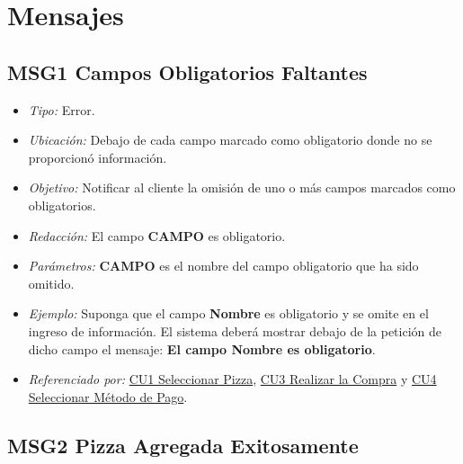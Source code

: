 
\pagebreak
\section{Mensajes}

	\hypertarget{MSG1:CamposObligatorios}{}
	\subsection{MSG1 Campos Obligatorios Faltantes}

		\begin{itemize}

			\item \textit{Tipo:} Error.

			\item\textit{Ubicación:}  Debajo de cada campo marcado como obligatorio donde no se proporcionó información.

			\item \textit{Objetivo:} Notificar al cliente la omisión de uno o más campos marcados como obligatorios.

			\item \textit{Redacción:} El campo \textbf{CAMPO} es obligatorio.

			\item \textit{Parámetros:} \textbf{CAMPO} es el nombre del campo obligatorio que ha sido omitido.

			\item \textit{Ejemplo:} Suponga que el campo \textbf{Nombre} es obligatorio y se omite en el ingreso de información. El sistema deberá mostrar debajo de la petición de dicho campo el mensaje: \textbf{El campo Nombre es obligatorio}.

			\item \textit{Referenciado por:} \hyperlink{CU1}{CU1 Seleccionar Pizza}, \hyperlink{CU3}{CU3 Realizar la Compra} y \hyperlink{CU4}{CU4 Seleccionar Método de Pago}.

		\end{itemize}
	
\hypertarget{MSG2:PizzaAgregada}{}
\subsection{MSG2 Pizza Agregada Exitosamente}

